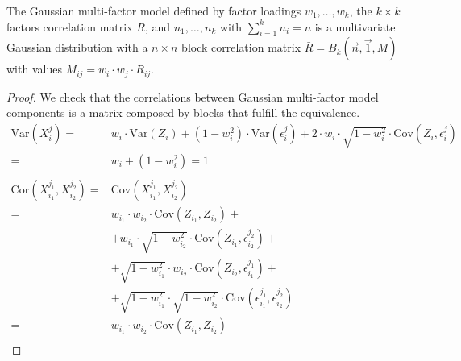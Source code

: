 \documentclass[11pt,fleqn]{book} %
\begin{document}
\begin{proposition}
	\label{prop:gmfigs}
	The Gaussian multi-factor model defined by factor loadings 
	$w_1,\dots,w_k$, the $k {\times} k$ factors correlation matrix $R$, and
	$n_1,\dots,n_k$ with $\sum_{i=1}^k n_i = n$ is a multivariate Gaussian 
	distribution with a $n {\times} n$ block correlation matrix 
	$\bar{R}=B_k(\vec{n},\vec{1},M)$ with values
	$M_{ij} = w_i \cdot w_j \cdot R_{ij}$.
\end{proposition}
\begin{proof}
	We check that the correlations between Gaussian multi-factor model
	components is a matrix composed by blocks that fulfill the equivalence.
	\begin{displaymath}
		\begin{array}{rl}
			\text{Var}(X_i^j) =                       &                                                                                                            
			w_i \cdot \text{Var}(Z_i) + (1-w_i^2) \cdot \text{Var}(\epsilon_i^j) +
			2 \cdot w_i \cdot \sqrt{1-w_i^2} \cdot \text{Cov}(Z_i, \epsilon_i^j) \\
			=                                         & w_i + (1-w_i^2) = 1                                                                                        \\
			                                          &                                                                                                            \\
			\text{Cor}(X_{i_1}^{j_1},X_{i_2}^{j_2}) = & \text{Cov}(X_{i_1}^{j_1},X_{i_2}^{j_2})                                                                    \\
			=                                         & w_{i_1} \cdot w_{i_2} \cdot \text{Cov}(Z_{i_1},Z_{i_2}) +                                                  \\
			                                          & + w_{i_1} \cdot \sqrt{1-w_{i_2}^2} \cdot \text{Cov}(Z_{i_1}, \epsilon_{i_2}^{j_2}) +                       \\
			                                          & + \sqrt{1-w_{i_1}^2} \cdot w_{i_2} \cdot \text{Cov}(Z_{i_2}, \epsilon_{i_1}^{j_1}) +                       \\
			                                          & + \sqrt{1-w_{i_1}^2} \cdot \sqrt{1-w_{i_2}^2} \cdot \text{Cov}(\epsilon_{i_1}^{j_1}, \epsilon_{i_2}^{j_2}) \\
			=                                         & w_{i_1} \cdot w_{i_2} \cdot \text{Cov}(Z_{i_1}, Z_{i_2})                                                   \\

\end{array}
\end{displaymath}
\end{proof}
\end{document}
